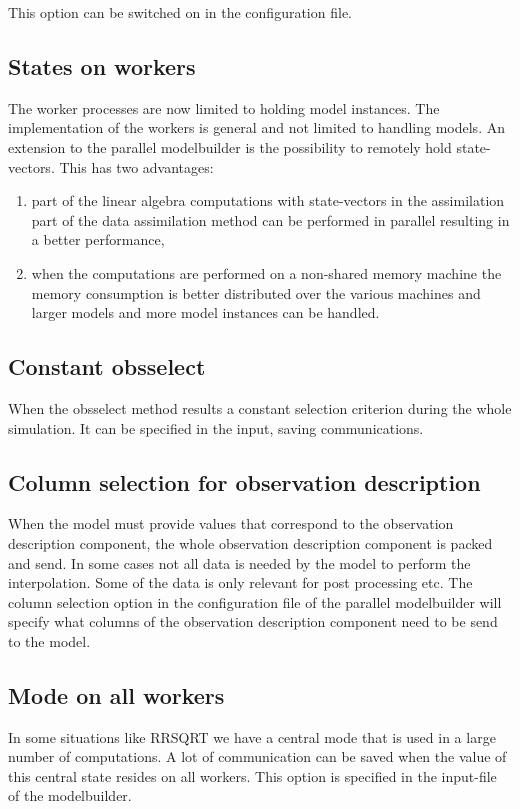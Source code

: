 \documentclass[a4paper,12pt]{article}
\begin{document}
This option can be switched on in the configuration file.

\subsection{States on workers}
The worker processes are now limited to holding model instances. The
implementation of the workers is general and not limited to handling
models. An extension to the parallel modelbuilder is the possibility to
remotely hold state-vectors.  This has two advantages:
\begin{enumerate}
\item part of the linear algebra computations with state-vectors in the
assimilation part of the data assimilation method can be performed
in parallel resulting in a better performance,
\item when the computations are performed on a non-shared memory machine
the memory consumption is better distributed over the various machines and
larger models and more model instances can be handled. 
\end{enumerate}

\subsection{Constant obsselect}
When the obsselect method results a constant selection criterion during the
whole simulation. It can be specified in the input, saving communications.


\subsection{Column selection for observation description}
When the model must provide values that correspond to the observation
description component, the whole observation description component is
packed and send. In some cases not all data is needed by the model to
perform the interpolation. Some of the data is only relevant for post
processing etc. The column selection option in the configuration file of
the parallel modelbuilder will specify what columns of the observation
description component need to be send to the model.

\subsection{Mode on all workers}
In some situations like RRSQRT we have a central mode that is used in a
large number of computations. A lot of communication can be saved when the
value of this central state resides on all workers. This option is
specified in the input-file of the modelbuilder.
\end{document}
